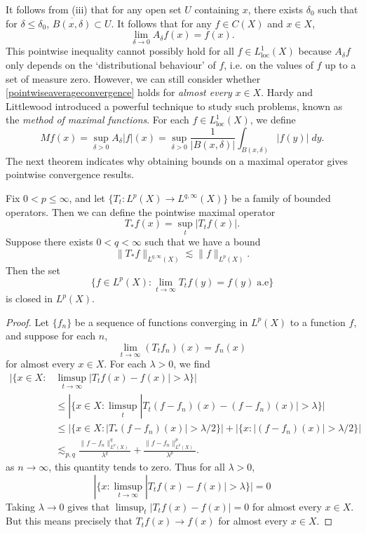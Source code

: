 It follows from (iii) that for any open set $U$ containing $x$, there exists $\delta_0$ such that for $\delta \leq \delta_0$, $\overline{B(x,\delta)} \subset U$. It follows that for any $f \in C(X)$ and $x \in X$,
%
\begin{equation} \label{pointwiseaverageconvergence}
  \lim_{\delta \to 0} A_\delta f(x) = f(x).
\end{equation}
%
This pointwise inequality cannot possibly hold for all $f \in L^1_{\text{loc}}(X)$ because $A_\delta f$ only depends on the `distributional behaviour' of $f$, i.e. on the values of $f$ up to a set of measure zero. However, we can still consider whether \eqref{pointwiseaverageconvergence} holds for \emph{almost every} $x \in X$. Hardy and Littlewood introduced a powerful technique to study such problems, known as the \emph{method of maximal functions}. For each $f \in L^1_{\text{loc}}(X)$, we define
%
\[ Mf(x) = \sup_{\delta > 0} A_\delta |f|(x) = \sup_{\delta > 0} \frac{1}{|B(x,\delta)|} \int_{B(x,\delta)} |f(y)|\; dy. \]
%
The next theorem indicates why obtaining bounds on a maximal operator gives pointwise convergence results.

\begin{theorem}
  Fix $0 < p \leq \infty$, and let $\{ T_t: L^p(X) \to L^{q,\infty}(X) \}$ be a family of bounded operators. Then we can define the pointwise maximal operator
  \[ T_* f(x) = \sup_t |T_t f(x)|. \]
  Suppose there exists $0 < q < \infty$ such that we have a bound
  \[ \| T_* f \|_{L^{q,\infty}(X)} \lesssim \| f \|_{L^p(X)}. \]
  Then the set
  \[ \{ f \in L^p(X) : \lim_{t \to \infty} T_t f(y) = f(y)\; \text{a.e} \} \]
  is closed in $L^p(X)$.
\end{theorem}
\begin{proof}
  Let $\{ f_n \}$ be a sequence of functions converging in $L^p(X)$ to a function $f$, and suppose for each $n$,
  \[ \lim_{t \to \infty} (T_t f_n)(x) = f_n(x) \]
  for almost every $x \in X$. For each $\lambda > 0$, we find
  \begin{align*}
    |\{ x \in X: &\limsup_{t \to \infty} |T_t f(x) - f(x)| > \lambda \}|\\
    &\leq |\{ x \in X: \limsup_t |T_t(f - f_n)(x) - (f - f_n)(x)| > \lambda \}|\\
    &\leq |\{ x \in X : |T_*(f - f_n)(x)| > \lambda/2 \}| + | \{ x: |(f - f_n)(x)| > \lambda/2 \} |\\
    &\lesssim_{p,q} \frac{\| f - f_n \|_{L^p(X)}^q}{\lambda^q} + \frac{\| f - f_n \|_{L^p(X)}^p}{\lambda^p}.
  \end{align*}
  as $n \to \infty$, this quantity tends to zero. Thus for all $\lambda > 0$,
  \[ |\{ x: \limsup_{t \to \infty} |T_t f(x) - f(x)| > \lambda \}| = 0 \]
  Taking $\lambda \to 0$ gives that $\limsup_t |T_t f(x) - f(x)| = 0$ for almost every $x \in X$. But this means precisely that $T_tf(x) \to f(x)$ for almost every $x \in X$.
\end{proof}

